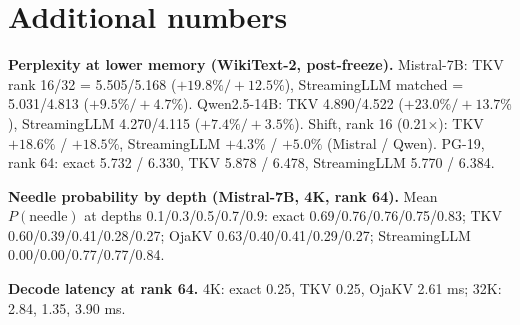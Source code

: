 \documentclass{article}
\begin{document}
\section{Additional numbers}
\label{app:numbers}

\textbf{Perplexity at lower memory (WikiText-2, post-freeze).}
Mistral-7B: TKV rank 16/32 = 5.505/5.168 ($+19.8\%/{+}12.5\%$), StreamingLLM
matched = 5.031/4.813 ($+9.5\%/{+}4.7\%$). Qwen2.5-14B: TKV 4.890/4.522
($+23.0\%/{+}13.7\%$), StreamingLLM 4.270/4.115 ($+7.4\%/{+}3.5\%$). Shift, rank
16 (0.21$\times$): TKV $+18.6\%$ / $+18.5\%$, StreamingLLM $+4.3\%$ / $+5.0\%$
(Mistral / Qwen). PG-19, rank 64: exact 5.732 / 6.330, TKV 5.878 / 6.478,
StreamingLLM 5.770 / 6.384.

\textbf{Needle probability by depth (Mistral-7B, 4K, rank 64).}
Mean $P(\text{needle})$ at depths 0.1/0.3/0.5/0.7/0.9: exact
0.69/0.76/0.76/0.75/0.83; TKV 0.60/0.39/0.41/0.28/0.27; OjaKV
0.63/0.40/0.41/0.29/0.27; StreamingLLM 0.00/0.00/0.77/0.77/0.84.

\textbf{Decode latency at rank 64.} 4K: exact 0.25, TKV 0.25, OjaKV 2.61 ms;
32K: 2.84, 1.35, 3.90 ms.
\end{document}
